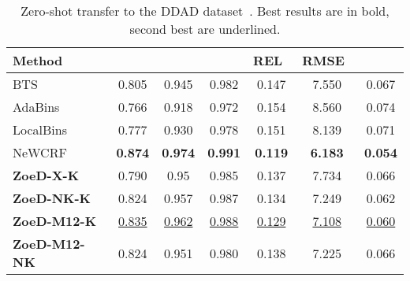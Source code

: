 \documentclass[10pt,twocolumn,letterpaper]{article}
\begin{document}
\begin{table}[htb]
\centering
\setlength{\tabcolsep}{3pt} \small
\begin{tabular}{@{}lcccccc@{}}
\toprule

Method &  &  &  & REL~ & RMSE~ & \\ \midrule
BTS~\cite{bts_lee2019big}               & 0.805     & 0.945     & 0.982     & 0.147     & 7.550     & 0.067    \\ 
AdaBins~\cite{bhat2021adabins}          & 0.766     & 0.918     & 0.972     & 0.154     & 8.560     & 0.074    \\ 
LocalBins~\cite{bhat2022localbins}      & 0.777     & 0.930     & 0.978     & 0.151     & 8.139     & 0.071     \\
NeWCRF~\cite{yuan2022new}               & \textbf{0.874}     & \textbf{0.974}     & \textbf{0.991}     & \textbf{0.119}     & \textbf{6.183}     & \textbf{0.054}     \\ 
\midrule
\textbf{ZoeD-X-K}       &  0.790  & 0.95  & 0.985 &     0.137 &  7.734 &    0.066 \\ 
\textbf{ZoeD-NK-K}      & 0.824 & 0.957 & 0.987 &     0.134 &  7.249 &    0.062 \\
\textbf{ZoeD-M12-K}     & \underline{0.835} & \underline{0.962} & \underline{0.988} &     \underline{0.129} &  \underline{7.108} &    \underline{0.060} \\
\textbf{ZoeD-M12-NK}    & 0.824 & 0.951 &  0.980 & 0.138 & 7.225 & 0.066 \\
\bottomrule
\end{tabular}
\caption{Zero-shot transfer to the DDAD dataset~\cite{packnet}. Best results are in bold, second best are underlined.}
\label{tab:ddad-full}
\end{table}
\end{document}
